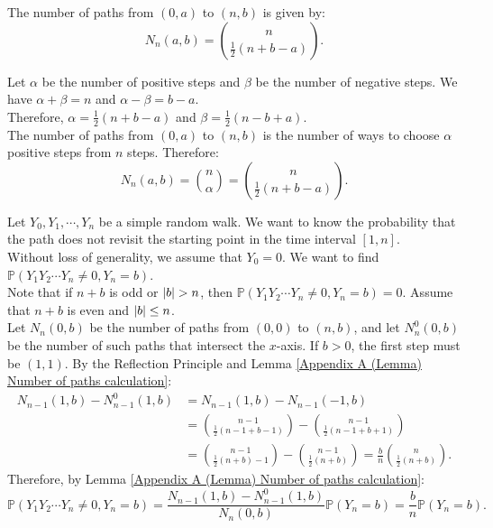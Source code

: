 \documentclass{huhtakm-template-book-v2}
\newcommand{\prob}{\mathbb{P}}
\begin{document}
    \begin{lem}
        \label{Appendix A (Lemma) Number of paths calculation}
        The number of paths from $(0,a)$ to $(n,b)$ is given by:
        \begin{equation*}
            N_{n}(a, b) = \binom{n}{\frac{1}{2}(n+b-a)}.
        \end{equation*}
    \end{lem}
    \begin{proofing}
        Let $\alpha$ be the number of positive steps and $\beta$ be the number of negative steps. We have $\alpha+\beta = n$ and $\alpha-\beta = b-a$.\\
        Therefore, $\alpha = \frac{1}{2}(n+b-a)$ and $\beta = \frac{1}{2}(n-b+a)$.\\
        The number of paths from $(0,a)$ to $(n,b)$ is the number of ways to choose $\alpha$ positive steps from $n$ steps. Therefore:
        \begin{equation*}
            N_{n}(a, b) = \binom{n}{\alpha} = \binom{n}{\frac{1}{2}(n+b-a)}.
        \end{equation*}
    \end{proofing}
    \begin{eg}
        Let $Y_{0},Y_{1},\cdots,Y_{n}$ be a simple random walk. We want to know the probability that the path does not revisit the starting point in the time interval $[1,n]$.\\
        Without loss of generality, we assume that $Y_{0} = 0$. We want to find $\prob(Y_{1}Y_{2}\cdots Y_{n} \neq 0,Y_{n} = b)$.\\
        Note that if $n+b$ is odd or $\left|{b}\right| > n$, then $\prob(Y_{1}Y_{2}\cdots Y_{n} \neq 0,Y_{n} = b) = 0$. Assume that $n+b$ is even and $\left|{b}\right| \leq n$.\\
        Let $N_{n}(0,b)$ be the number of paths from $(0,0)$ to $(n,b)$, and let $N_{n}^{0}(0,b)$ be the number of such paths that intersect the $x$-axis. If $b > 0$, the first step must be $(1,1)$. By the Reflection Principle and Lemma \ref{Appendix A (Lemma) Number of paths calculation}:
        \begin{align*}
            N_{n-1}(1,b)-N_{n-1}^{0}(1,b) &= N_{n-1}(1,b)-N_{n-1}(-1,b)\\
            &= \binom{n-1}{\frac{1}{2}(n-1+b-1)}-\binom{n-1}{\frac{1}{2}(n-1+b+1)}\\
            &= \binom{n-1}{\frac{1}{2}(n+b)-1}-\binom{n-1}{\frac{1}{2}(n+b)} = \frac{b}{n}\binom{n}{\frac{1}{2}(n+b)}.
        \end{align*}
        Therefore, by Lemma \ref{Appendix A (Lemma) Number of paths calculation}:
        \begin{equation*}
            \prob(Y_{1}Y_{2}\cdots Y_{n} \neq 0,Y_{n} = b) = \frac{N_{n-1}(1,b)-N_{n-1}^{0}(1,b)}{N_{n}(0,b)}\prob(Y_{n} = b) = \frac{b}{n}\prob(Y_{n} = b).
        \end{equation*}
    \end{eg}
    \newpage
\end{document}
